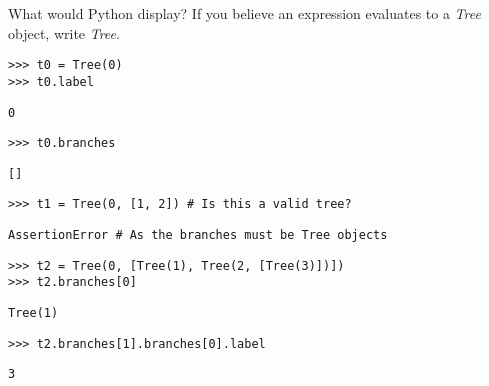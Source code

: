 \question What would Python display? If you believe an expression evaluates
to a \textit{Tree} object, write \textit{Tree}.

\begin{lstlisting}
>>> t0 = Tree(0)
>>> t0.label
\end{lstlisting}

\begin{solution}[0.2in]
\lstinline{0}
\end{solution}

\lstinline{>>> t0.branches}

\begin{solution}[0.2in]
\lstinline{[]}
\end{solution}

\lstinline{>>> t1 = Tree(0, [1, 2]) # Is this a valid tree?}

\begin{solution}[0.2in]
\lstinline{AssertionError # As the branches must be Tree objects}
\end{solution}

\begin{lstlisting}
>>> t2 = Tree(0, [Tree(1), Tree(2, [Tree(3)])])
>>> t2.branches[0]
\end{lstlisting}

\begin{solution}[0.2in]
\lstinline{Tree(1)}
\end{solution}

\begin{lstlisting}
>>> t2.branches[1].branches[0].label
\end{lstlisting}

\begin{solution}[0.2in]
\lstinline{3}
\end{solution}
